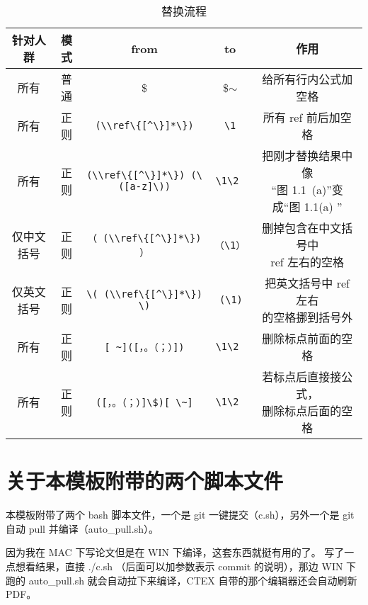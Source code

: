 \begin{table}
    \centering
\caption{替换流程}
\label{tb:replace}
    \begin{tabular}{>{\xiaowu}c|>{\xiaowu}c|>{\xiaowu}c|>{\xiaowu}c|>{\xiaowu}c}  \hline
    针对人群 & 模式 & from & to  & 作用 \\\hline
    所有 & 普通 & {\$} & \$$\sim$  & 给所有行内公式加空格 \\\hline
    所有 & 正则 & \verb|(\\ref\{[^\}]*\})| & \verb*| \1 |  & 所有 ref 前后加空格 \\\hline
    所有 & 正则 & \verb*|(\\ref\{[^\}]*\}) (\([a-z]\))| & \verb*|\1\2 |  & \parbox[c][1cm][c]{4cm}{\centering 把刚才替换结果中像\\ “图 1.1~(a)”变成“图 1.1(a) ”} \\\hline
    仅中文括号 & 正则 & \verb*|（ (\\ref\{[^\}]*\}) ）| & \verb|（\1）|  & \parbox[c][1cm][c]{4cm}{\centering 删掉包含在中文括号中\\ ref 左右的空格} \\\hline
    \parbox[c][0.6cm][c]{1cm}{\centering 仅英文\\括号} & 正则 & \verb*|\( (\\ref\{[^\}]*\}) \)| & \verb*| (\1) |  & \parbox[c][1cm][c]{5cm}{\centering 把英文括号中 ref 左右\\ 的空格挪到括号外} \\\hline
    所有 & 正则 & \verb*|[ ~]([，。（；）])| & \verb|\1\2 |  & 删除标点前面的空格 \\\hline
    所有 & 正则 & \verb*|([，。（；）]\$)[ \~]| & \verb|\1\2 |  & \parbox[c][1cm][c]{5cm}{\centering 若标点后直接接公式，\\ 删除标点后面的空格}    \\ \hline
    \end{tabular}
\end{table}

\section{关于本模板附带的两个脚本文件}

本模板附带了两个 bash 脚本文件，一个是 git 一键提交（c.sh），另外一个是 git 自动 pull 并编译（auto\_pull.sh）。

因为我在 MAC 下写论文但是在 WIN 下编译，这套东西就挺有用的了。
写了一点想看结果，直接 ./c.sh （后面可以加参数表示 commit 的说明），那边 WIN 下跑的 auto\_pull.sh 就会自动拉下来编译，CTEX 自带的那个编辑器还会自动刷新 PDF。

